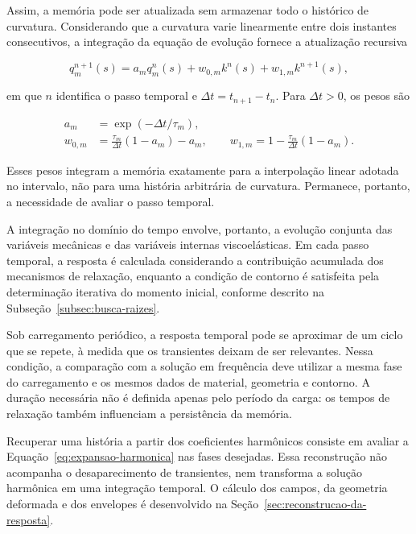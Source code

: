 \documentclass[arial,centeredequations,english,brazilian,oneside,section=TITLE]{ifes8}
\begin{document}
Assim, a memória pode ser atualizada sem armazenar todo o histórico de curvatura.
Considerando que a curvatura varie linearmente entre dois instantes consecutivos,
a integração da equação de evolução fornece a atualização recursiva

\begin{equation}
  q_m^{n+1}(s)
  =
  a_m q_m^n(s)
  +
  w_{0,m}k^n(s)
  +
  w_{1,m}k^{n+1}(s),
  \label{eq:recursao-viscoelastica}
\end{equation}

em que $n$ identifica o passo temporal e $\Delta t=t_{n+1}-t_n$.
Para $\Delta t>0$, os pesos são

\begin{align}
  a_m&=\exp(-\Delta t/\tau_m),\\
  w_{0,m}&=\frac{\tau_m}{\Delta t}(1-a_m)-a_m,\qquad
  w_{1,m}=1-\frac{\tau_m}{\Delta t}(1-a_m).
  \label{eq:pesos-memoria-prony}
\end{align}

Esses pesos integram a memória exatamente para a interpolação linear adotada
no intervalo, não para uma história arbitrária de curvatura. Permanece, portanto,
a necessidade de avaliar o passo temporal.

A integração no domínio do tempo envolve, portanto, a evolução
conjunta das variáveis mecânicas e das variáveis internas
viscoelásticas. Em cada passo temporal, a resposta é calculada
considerando a contribuição acumulada dos mecanismos de
relaxação, enquanto a condição de contorno é satisfeita pela
determinação iterativa do momento inicial, conforme descrito
na Subseção~\ref{subsec:busca-raizes}.

Sob carregamento periódico, a resposta temporal pode se aproximar de um ciclo
que se repete, à medida que os transientes deixam de ser relevantes. Nessa condição,
a comparação com a solução em frequência deve utilizar a mesma fase do carregamento
e os mesmos dados de material, geometria e contorno. A duração necessária não é
definida apenas pelo período da carga: os tempos de relaxação também influenciam
a persistência da memória.

Recuperar uma história a partir dos coeficientes harmônicos consiste em avaliar
a Equação~\eqref{eq:expansao-harmonica} nas fases desejadas. Essa reconstrução
não acompanha o desaparecimento de transientes, nem transforma a solução harmônica
em uma integração temporal. O cálculo dos campos, da geometria deformada e dos
envelopes é desenvolvido na Seção~\ref{sec:reconstrucao-da-resposta}.
\end{document}
